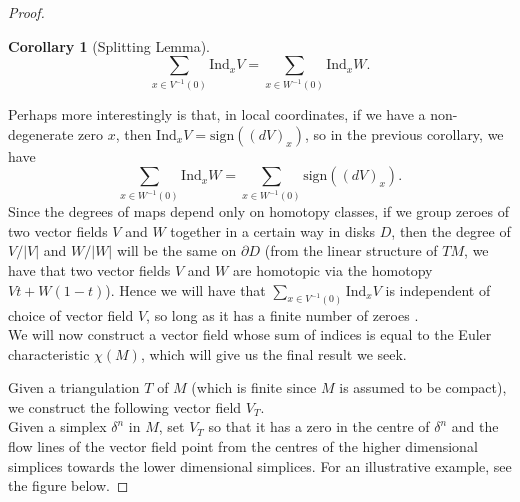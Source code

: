 \documentclass[12pt,a4paper]{article}
\numberwithin{equation}{section}
\newtheorem{corollary}{Corollary}[section]
\theoremstyle{definition}
\newtheorem{proposition}{Proposition}[section]
\theoremstyle{remark}
\begin{document}
\begin{proof}
\begin{corollary}[Splitting Lemma]
\[
\sum_{x\in V^{-1}(0)}\mathrm{Ind}_xV=\sum_{x\in W^{-1}(0)}\mathrm{Ind}_xW.
\]
\end{corollary}
Perhaps more interestingly is that, in local coordinates, if we have a non-degenerate zero $x$, then $\mathrm{Ind}_xV=\mathrm{sign}((dV)_x)$, so in the previous corollary, we have
\[
\sum_{x\in W^{-1}(0)}\mathrm{Ind}_xW=\sum_{x\in W^{-1}(0)}\mathrm{sign}((dV)_x).
\]
Since the degrees of maps depend only on homotopy classes, if we group zeroes of two vector fields $V$ and $W$ together in a certain way in disks $D$, then the degree of $V/|V|$ and $W/|W|$ will be the same on $\partial D$ (from the linear structure of $TM$, we have that two vector fields $V$ and $W$ are homotopic via the homotopy $Vt+W(1-t)$). Hence we will have that $\sum_{x\in V^{-1}(0)}\mathrm{Ind}_xV$ is independent of choice of vector field $V$, so long as it has a finite number of zeroes \cite{wrightPoincare, BurnsGidea}.\\

We will now construct a vector field whose sum of indices is equal to the Euler characteristic $\chi(M)$, which will give us the final result we seek.

Given a triangulation $T$ of $M$ (which is finite since $M$ is assumed to be compact), we construct the following vector field $V_T$. \\

Given a simplex $\delta^n$ in $M$, set $V_T$ so that it has a zero in the centre of $\delta^n$ and the flow lines of the vector field point from the centres of the higher dimensional simplices towards the lower dimensional simplices. For an illustrative example, see the figure below. 


\end{proof}
\end{document}
